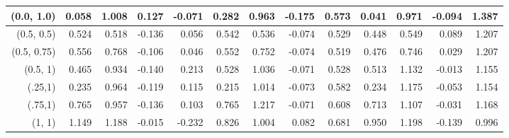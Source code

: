 \documentclass[11pt,fleqn]{article}
\begin{document}
{\begin{landscape}
\begin{table}[!ht]
\begin{tabular}{|r|rrrr|rrrr|rrrr|}
			(0.0, 1.0) & 0.058 & 1.008 & 0.127 & -0.071 & 0.282 & 0.963 & -0.175 & 0.573 & 0.041 & 0.971 & -0.094 & 1.387 \\
			\hline
			(0.5, 0.5) & 0.524 & 0.518 & -0.136 & 0.056 & 0.542 & 0.536 & -0.074 & 0.529 & 0.448 & 0.549 & 0.089 & 1.207 \\
			(0.5, 0.75) & 0.556 & 0.768 & -0.106 & 0.046 & 0.552 & 0.752 & -0.074 & 0.519 & 0.476 & 0.746 & 0.029 & 1.207 \\
			(0.5, 1) & 0.465 & 0.934 & -0.140 & 0.213 & 0.528 & 1.036 & -0.071 & 0.528 & 0.513 & 1.132 & -0.013 & 1.155 \\
			\hline
			(.25,1) & 0.235 & 0.964 & -0.119 & 0.115 & 0.215 & 1.014 & -0.073 & 0.582 & 0.234 & 1.175 & -0.053 & 1.154 \\
			(.75,1) & 0.765 & 0.957 & -0.136 & 0.103 & 0.765 & 1.217 & -0.071 & 0.608 & 0.713 & 1.107 & -0.031 & 1.168 \\
			(1, 1) & 1.149 & 1.188 & -0.015 & -0.232 & 0.826 & 1.004 & 0.082 & 0.681 & 0.950 & 1.198 & -0.139 & 0.996 \\
			\hline
		\end{tabular}
		\label{tab:1}
	\end{table}
	
	\newpage
	

\end{landscape}}
\end{document}

